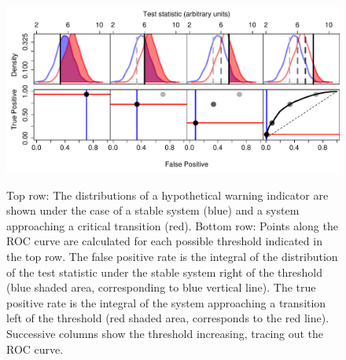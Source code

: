 \documentclass[authoryear,preprint,11pt]{elsarticle}
\begin{document}
\begin{figure}[hb]
   \begin{center}
     \includegraphics[width=\linewidth]{Fig1}
     \label{fig:roc_intro}
     \caption{Top row: The distributions of a hypothetical warning indicator are shown under the case of a stable system (blue) and a system approaching a critical transition (red).  Bottom row: Points along the ROC curve are calculated for each possible threshold indicated in the top row.  The false positive rate is the integral of the distribution of the test statistic under the stable system right of the threshold (blue shaded area, corresponding to blue vertical line).  The true positive rate is the integral of the system approaching a transition left of the threshold (red shaded area, corresponds to the red line).  Successive columns show the threshold increasing, tracing out the ROC curve.}
  \end{center}
 \end{figure}
\end{document}
